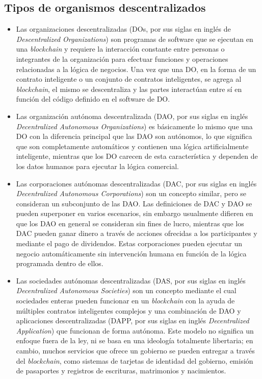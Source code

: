 \subsection{Tipos de organismos descentralizados}
\begin{itemize}
    \item Las organizaciones descentralizadas (DOs, por sus siglas en inglés de {\it Descentralized Organizations})  son programas de software que se ejecutan en una \textit{blockchain} y requiere la interacción constante entre personas o integrantes de la organización para efectuar funciones y operaciones relacionadas a la lógica de negocios. Una vez que una DO, en la forma de un contrato inteligente o un conjunto de contratos inteligentes, se agrega al \textit{blockchain}, el mismo se descentraliza y las partes interactúan entre sí en función del código definido en el software de DO.
    \item Las organización autónoma descentralizada (DAO, por sus siglas en inglés {\it Decentralized Autonomous Organizations})  es básicamente lo mismo que una DO con la diferencia principal que las DAO son autónomos, lo que significa que son completamente automáticos y contienen una lógica artificialmente inteligente, mientras que los DO carecen de esta característica y dependen de los datos humanos para ejecutar la lógica comercial.
    \item Las corporaciones autónomas descentralizadas (DAC, por sus siglas en inglés {\it Decentralized Autonomous	Corporations}) son un concepto similar, pero se consideran un subconjunto de las  DAO. Las definiciones de DAC y DAO se pueden superponer en varios escenarios, sin embargo usualmente difieren en  que los DAO en general se consideran sin fines de lucro, mientras que los DAC pueden ganar dinero a través de acciones ofrecidas a los participantes y mediante el pago de dividendos. Estas corporaciones pueden ejecutar un negocio automáticamente sin intervención humana en función de la lógica programada dentro de ellos.
    \item Las sociedades autónomas descentralizadas (DAS, por sus siglas en inglés {\it Decentralized Autonomous	Societies}) son un concepto mediante el cual sociedades enteras pueden funcionar en un \textit{blockchain} con la ayuda de múltiples contratos inteligentes complejos y una combinación de DAO y aplicaciones descentralizadas (DAPP, por sus siglas en inglés {\it Decentralized	Application}) que funcionan de forma autónoma. Este modelo no significa un enfoque fuera de la ley, ni se basa en una ideología totalmente libertaria; en cambio, muchos servicios que ofrece un gobierno se pueden entregar a través del \textit{blockchain}, como sistemas de tarjetas de identidad del gobierno, emisión de pasaportes y registros de escrituras, matrimonios y nacimientos.

\end{itemize}
